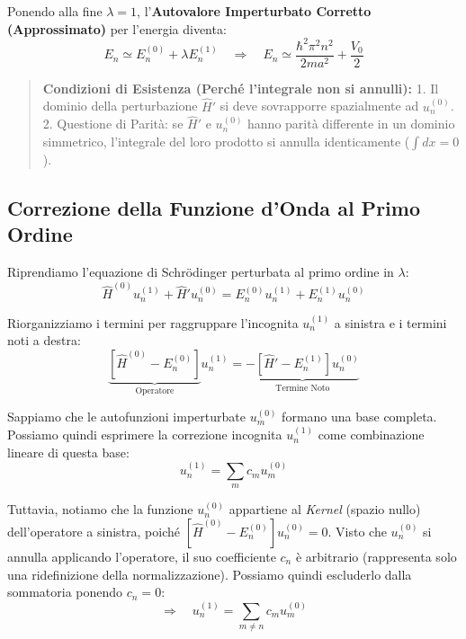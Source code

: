 \documentclass[11pt, a4paper]{article}
\begin{document}
\noindent
Ponendo alla fine $\lambda=1$, l'\textbf{Autovalore Imperturbato Corretto (Approssimato)} per l'energia diventa: %
\begin{equation}
    E_n \simeq E_n^{(0)} + \lambda E_n^{(1)} \quad \Rightarrow \quad \boxed{ E_n \simeq \frac{\hbar^2 \pi^2 n^2}{2m a^2} + \frac{V_0}{2} } %
\end{equation}

\begin{quote}
    \textbf{Condizioni di Esistenza (Perché l'integrale non si annulli):} %
    1. Il dominio della perturbazione $\hat{H}'$ si deve sovrapporre spazialmente ad $u_n^{(0)}$. %
    2. Questione di Parità: se $\hat{H}'$ e $u_n^{(0)}$ hanno parità differente in un dominio simmetrico, l'integrale del loro prodotto si annulla identicamente ($\int dx = 0$). %
\end{quote}

\subsection{Correzione della Funzione d'Onda al Primo Ordine} %

Riprendiamo l'equazione di Schrödinger perturbata al primo ordine in $\lambda$: %
\begin{equation*}
    \hat{H}^{(0)} u_n^{(1)} + \hat{H}' u_n^{(0)} = E_n^{(0)} u_n^{(1)} + E_n^{(1)} u_n^{(0)} %
\end{equation*}

\noindent
Riorganizziamo i termini per raggruppare l'incognita $u_n^{(1)}$ a sinistra e i termini noti a destra: %
\begin{equation}
    \underbrace{ \left[ \hat{H}^{(0)} - E_n^{(0)} \right] }_{\text{Operatore}} u_n^{(1)} = \underbrace{ -\left[ \hat{H}' - E_n^{(1)} \right] u_n^{(0)} }_{\text{Termine Noto}} %
\end{equation}

\noindent
Sappiamo che le autofunzioni imperturbate $u_m^{(0)}$ formano una base completa. Possiamo quindi esprimere la correzione incognita $u_n^{(1)}$ come combinazione lineare di questa base: %
\begin{equation*}
    u_n^{(1)} = \sum_m c_m u_m^{(0)} %
\end{equation*}

\noindent
Tuttavia, notiamo che la funzione $u_n^{(0)}$ appartiene al \textit{Kernel} (spazio nullo) dell'operatore a sinistra, poiché $[\hat{H}^{(0)} - E_n^{(0)}] u_n^{(0)} = 0$. %
Visto che $u_n^{(0)}$ si annulla applicando l'operatore, il suo coefficiente $c_n$ è arbitrario (rappresenta solo una ridefinizione della normalizzazione). Possiamo quindi escluderlo dalla sommatoria ponendo $c_n = 0$: %
\begin{equation}
    \Rightarrow \quad u_n^{(1)} = \sum_{m \neq n} c_m u_m^{(0)} %
\end{equation}
\end{document}
